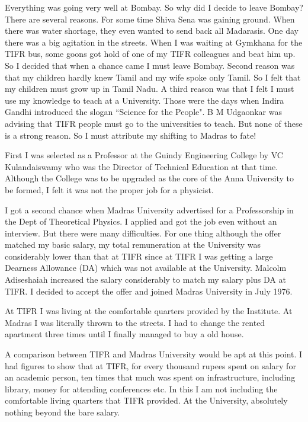 Everything was going very well at Bombay. So why did I decide to leave 
Bombay? There are several reasons. For some time Shiva Sena was gaining 
ground. When there was water shortage, they even wanted to send back all 
Madarasis. One day there was a big agitation in the streets. When I was 
waiting at Gymkhana for the TIFR bus, some goons got hold of one of my 
TIFR colleagues and beat him up. So I decided that when a chance came I 
must leave Bombay. Second reason was that my children hardly knew Tamil 
and my wife spoke only Tamil. So I felt that my children must grow up in 
Tamil Nadu. A third reason was that I felt I must use my knowledge to 
teach at a University. Those were the days when Indira Gandhi introduced 
the slogan ``Science for the People". B M Udgaonkar was advising that 
TIFR people must go to the universities to teach. But none of these is a 
strong reason. So I must attribute my shifting to Madras to fate!

First I was selected as a Professor at the Guindy Engineering College by 
VC Kulandaiswamy who was the Director of Technical Education at that 
time. Although the College was to be upgraded as the core of the Anna 
University to be formed, I felt it was not the proper job for a 
physicist.

I got a second chance when Madras University advertised for a 
Professorship in the Dept of Theoretical Physics. I applied and got the 
job even without an interview. But there were many difficulties. For one 
thing although the offer matched my basic salary, my total remuneration 
at the University was considerably lower than that at TIFR since at TIFR 
I was getting a large Dearness Allowance (DA) which was not available at 
the University. Malcolm Adiseshaiah increased the salary considerably to 
match my salary plus DA at TIFR. I decided to accept the offer and 
joined Madras University in July 1976.

At TIFR I was living at the comfortable quarters provided by the 
Institute. At Madras I was literally thrown to the streets. I had to 
change the rented apartment three times until I finally managed to buy a 
old house.

A comparison between TIFR and Madras University would be apt at this 
point. I had figures to show that at TIFR, for every thousand rupees 
spent on salary for an academic person, ten times that much was spent on 
infrastructure, including library, money for attending conferences etc. 
In this I am not including the comfortable living quarters that TIFR 
provided. At the University, absolutely nothing beyond the bare salary.

